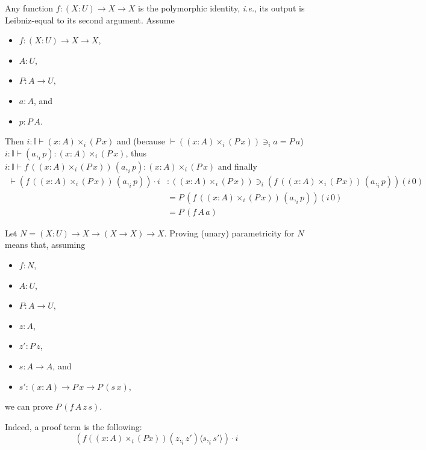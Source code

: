 \documentclass[english]{PaperTools/latex/lipics}
\newcommand\CP[3]{(#2,_{#1} #3)}
\newcommand\CTimes[2]{(#2) ×_{#1}}
\newcommand\param[1]{\!\cdot\!#1}
\newcommand\op[1]{∋_{#1}}
\newcommand\fp[3]{⟨#2 ,_{#1} #3⟩}
\newcommand\mor[2]{({#1}\,{#2})}
\newcommand\proj[2]{{#2}\mor{#1}0}
\def\ie{\textit{i.e.}}
\begin{document}
\begin{example}
  \label{ex:poly-id}
  Any function $f : (X : U) → X → X$ is the polymorphic identity, \ie,
  its output is Leibniz-equal to its second argument.
  Assume
  \begin{itemize}
    \item $f : (X : U) → X → X$,
    \item $A : U$,
    \item $P : A → U$,
    \item $a : A$, and
    \item $p : P\, A$.
  \end{itemize}
  Then
  $i:𝕀⊢\CTimes i {x:A} {(P\,x)}$
  and
  (because $⊢ (\CTimes i {x:A} {(P\,x)}) \op i a = P\,a$)
  $i:𝕀⊢\CP i a p : \CTimes i {x:A} {(P\,x)}$, thus
  $i:𝕀⊢f\, (\CTimes i {x:A} {(P\,x)})\, {\CP i a p} : \CTimes i {x:A} {(P\,x)}$
  and finally
  \begin{align*}
    ⊢(f\, (\CTimes i {x:A} {(P\,x)})\, {\CP i a p}) \param i
   &: (\CTimes i {x:A} {(P\,x)}) \op i \proj i {(f\, (\CTimes i {x:A} {(P\,x)})\, {\CP i a p})} \\
   &= P\, \proj i {(f\, (\CTimes i {x:A} {(P\,x)})\, {\CP i a p})} \\
   &= P\, (f\, A\, a)
  \end{align*}
\end{example}

\begin{example}
Let $N = (X : U) → X → (X → X) → X$.
Proving (unary) parametricity for $N$ means that, assuming
\begin{itemize}
\item $f : N$,
\item $A : U$,
\item $P : A → U$,
\item $z : A$,
\item $z' : P\, z$,
\item $s : A → A$, and
\item $s' : (x:A) → P\, x → P\, (s\, x)$,
\end{itemize}
we can prove $P\, (f\, A\, z\, s)$.

Indeed, a proof term is the following:
%
\[
(f (\CTimes i {x:A} (P x)) \CP i z {z'} \fp i s {s'}) \param i
\]
\end{example}
\end{document}
